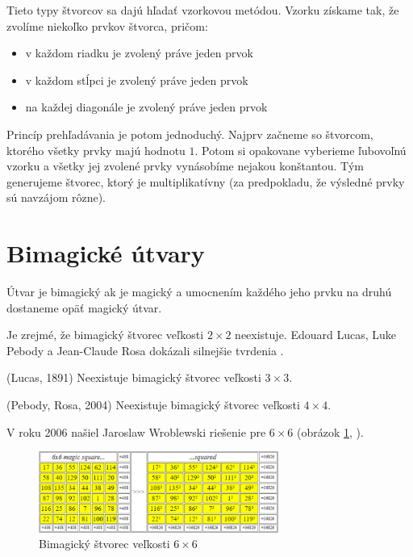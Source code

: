 Tieto typy štvorcov sa dajú hľadať vzorkovou metódou. Vzorku získame tak, že zvolíme niekoľko prvkov štvorca, pričom:
\begin{itemize}
\item v každom riadku je zvolený práve jeden prvok
\item v každom stĺpci je zvolený práve jeden prvok
\item na každej diagonále je zvolený práve jeden prvok
\end{itemize}

Princíp prehľadávania je potom jednoduchý. Najprv začneme so štvorcom, ktorého všetky prvky majú hodnotu $1$. Potom si opakovane vyberieme ľubovoľnú vzorku a všetky jej zvolené prvky vynásobíme nejakou konštantou. Tým generujeme štvorec, ktorý je multiplikatívny (za predpokladu, že výsledné prvky sú navzájom rôzne). \\

\section{Bimagické útvary}
\begin{definition} Útvar je bimagický ak je magický a umocnením každého jeho prvku na druhú dostaneme opäť magický útvar.
\end{definition}

Je zrejmé, že bimagický štvorec veľkosti $2 \times 2$ neexistuje. Edouard Lucas, Luke Pebody a Jean-Claude Rosa dokázali silnejšie tvrdenia \cite{multimagie}.

\begin{theorem} (Lucas, 1891) Neexistuje bimagický štvorec veľkosti $3 \times 3$.
\end{theorem}

\begin{theorem} (Pebody, Rosa, 2004) Neexistuje bimagický štvorec veľkosti $4 \times 4$.
\end{theorem}

V roku 2006 našiel Jaroslaw Wroblewski riešenie pre $6 \times 6$ (obrázok \ref{obr:fig_wroblewski_bimagic_6x6}, \cite{multimagie}).

\begin{figure}[H]
\centerline{\includegraphics[width=0.7\textwidth]{images/wroblewski_bimagic_6x6}}
\caption[Bimagický štvorec veľkosti $6 \times 6$]{Bimagický štvorec veľkosti $6 \times 6$ \cite{multimagie}}
\label{obr:fig_wroblewski_bimagic_6x6}
\end{figure}

